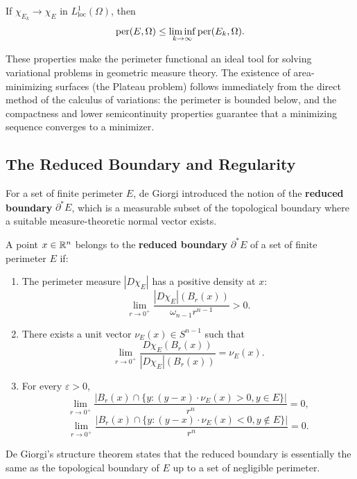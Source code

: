 \begin{theorem}
If \(\chi_{E_k} \to \chi_E\) in \(L^1_{\mathrm{loc}}(\Omega)\), then
\[
\operatorname{per}(E,\Omega) \leq \liminf_{k \to \infty} \operatorname{per}(E_k,\Omega).
\]
\end{theorem}

These properties make the perimeter functional an ideal tool for solving variational problems in geometric measure theory. The existence of area-minimizing surfaces (the Plateau problem) follows immediately from the direct method of the calculus of variations: the perimeter is bounded below, and the compactness and lower semicontinuity properties guarantee that a minimizing sequence converges to a minimizer.

\subsection{The Reduced Boundary and Regularity}

For a set of finite perimeter \(E\), de Giorgi introduced the notion of the \textbf{reduced boundary} \(\partial^* E\), which is a measurable subset of the topological boundary where a suitable measure-theoretic normal vector exists.

\begin{definition}
A point \(x \in \mathbb{R}^n\) belongs to the \textbf{reduced boundary} \(\partial^* E\) of a set of finite perimeter \(E\) if:
\begin{enumerate}
    \item The perimeter measure \(|D\chi_E|\) has a positive density at \(x\):
    \[
    \lim_{r \to 0^+} \frac{|D\chi_E|(B_r(x))}{\omega_{n-1} r^{n-1}} > 0.
    \]
    \item There exists a unit vector \(\nu_E(x) \in S^{n-1}\) such that
    \[
    \lim_{r \to 0^+} \frac{D\chi_E(B_r(x))}{|D\chi_E|(B_r(x))} = \nu_E(x).
    \]
    \item For every \(\varepsilon > 0\),
    \[
    \lim_{r \to 0^+} \frac{|B_r(x) \cap \{y: (y-x) \cdot \nu_E(x) > 0, y \in E\}|}{r^n} = 0,
    \]
    \[
    \lim_{r \to 0^+} \frac{|B_r(x) \cap \{y: (y-x) \cdot \nu_E(x) < 0, y \notin E\}|}{r^n} = 0.
    \]
\end{enumerate}
\end{definition}

De Giorgi's structure theorem states that the reduced boundary is essentially the same as the topological boundary of \(E\) up to a set of negligible perimeter.

